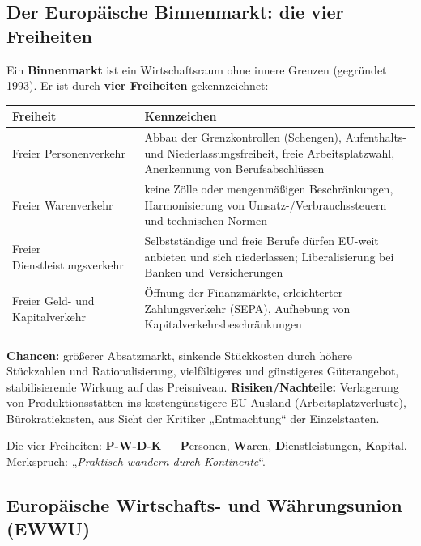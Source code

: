 \documentclass[11pt, a4paper]{article}
\begin{document}
\subsection{Der Europäische Binnenmarkt: die vier Freiheiten}

Ein \textbf{Binnenmarkt} ist ein Wirtschaftsraum ohne innere Grenzen (gegründet 1993). Er
ist durch \textbf{vier Freiheiten} gekennzeichnet:

\begin{center}
\begin{tabular}{p{4.2cm} p{9.6cm}}
\toprule
\textbf{Freiheit} & \textbf{Kennzeichen}\\
\midrule
Freier Personenverkehr & Abbau der Grenzkontrollen (Schengen), Aufenthalts- und Niederlassungsfreiheit, freie Arbeitsplatzwahl, Anerkennung von Berufsabschlüssen\\
Freier Warenverkehr & keine Zölle oder mengenmäßigen Beschränkungen, Harmonisierung von Umsatz-/Verbrauchssteuern und technischen Normen\\
Freier Dienstleistungsverkehr & Selbstständige und freie Berufe dürfen EU-weit anbieten und sich niederlassen; Liberalisierung bei Banken und Versicherungen\\
Freier Geld- und Kapitalverkehr & Öffnung der Finanzmärkte, erleichterter Zahlungsverkehr (SEPA), Aufhebung von Kapitalverkehrsbeschränkungen\\
\bottomrule
\end{tabular}
\end{center}

\textbf{Chancen:} größerer Absatzmarkt, sinkende Stückkosten durch höhere Stückzahlen und
Rationalisierung, vielfältigeres und günstigeres Güterangebot, stabilisierende Wirkung auf
das Preisniveau. \textbf{Risiken/Nachteile:} Verlagerung von Produktionsstätten ins
kostengünstigere EU-Ausland (Arbeitsplatzverluste), Bürokratiekosten, aus Sicht der
Kritiker „Entmachtung`` der Einzelstaaten.

\begin{eselsbruecke}
Die vier Freiheiten: \textbf{P-W-D-K} --- \textbf{P}ersonen, \textbf{W}aren,
\textbf{D}ienstleistungen, \textbf{K}apital. Merkspruch: „\emph{Praktisch wandern durch
Kontinente}``.
\end{eselsbruecke}

\subsection{Europäische Wirtschafts- und Währungsunion (EWWU)}
\end{document}

